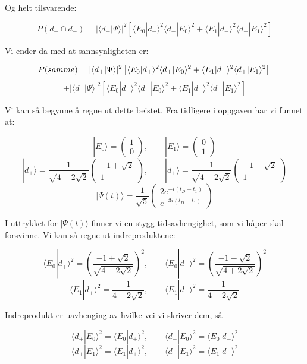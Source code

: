 \documentclass[a4paper,norsk, 10pt]{article}
\numberwithin{equation}{section}
\begin{document}
Og helt tilsvarende:

$$
P(d_- \cap d_-) = |\langle d_-|\Psi\rangle|^2\left[\langle E_0|d_-\rangle^2\langle d_-|E_0\rangle^2 + \langle E_1|d_-\rangle^2\langle d_-|E_1\rangle^2\right]
$$

Vi ender da med at sannsynligheten er:

$$
P(samme) = |\langle d_+|\Psi\rangle|^2\left[\langle E_0|d_+\rangle^2\langle d_+|E_0\rangle^2 + \langle E_1|d_+\rangle^2\langle d_+|E_1\rangle^2\right] \\
$$
$$
+
 |\langle d_-|\Psi\rangle|^2\left[\langle E_0|d_-\rangle^2\langle d_-|E_0\rangle^2 + \langle E_1|d_-\rangle^2\langle d_-|E_1\rangle^2\right]
$$

Vi kan så begynne å regne ut dette beistet. Fra tidligere i oppgaven har vi funnet at:

$$
|E_0\rangle = 
\begin{pmatrix}
1\\0
\end{pmatrix}
, \qquad
|E_1\rangle = 
\begin{pmatrix}
0\\1
\end{pmatrix}
$$
$$
|d_+\rangle = 
\frac{1}{\sqrt{4-2\sqrt{2}}}
\begin{pmatrix}
-1+\sqrt{2}\\1
\end{pmatrix}
,\qquad
|d_+\rangle = 
\frac{1}{\sqrt{4+2\sqrt{2}}}
\begin{pmatrix}
-1-\sqrt{2}\\1
\end{pmatrix}
$$
$$
|\Psi(t)\rangle = \frac{1}{\sqrt{5}}
\begin{pmatrix}
2e^{-i(t_D-t_1)} \\ e^{-3i(t_D-t_1)}
\end{pmatrix}
$$

I uttrykket for $|\Psi(t)\rangle$ finner vi en stygg tidsavhengighet, som vi håper skal forsvinne. Vi kan så regne ut indreproduktene:

$$
\langle E_0|d_+\rangle^2 = \left(\frac{-1 + \sqrt{2}}{\sqrt{4-2\sqrt{2}}}\right)^2, \qquad \langle E_0|d_-\rangle^2 = \left(\frac{-1 - \sqrt{2}}{\sqrt{4+2\sqrt{2}}}\right)^2
$$
$$
\langle E_1|d_+\rangle^2 = \frac{1}{4-2\sqrt{2}} ,\qquad \langle E_1|d_-\rangle^2 = \frac{1}{4+2\sqrt{2}} 
$$

Indreprodukt er uavhenging av hvilke vei vi skriver dem, så

$$
\langle d_+|E_0\rangle^2 = \langle E_0|d_+\rangle^2 ,\qquad \langle d_-|E_0\rangle^2 = \langle E_0|d_-\rangle^2
$$
$$
\langle d_+|E_1\rangle^2 = \langle E_1|d_+\rangle^2 ,\qquad \langle d_-|E_1\rangle^2 = \langle E_1|d_-\rangle^2
$$
\end{document}
